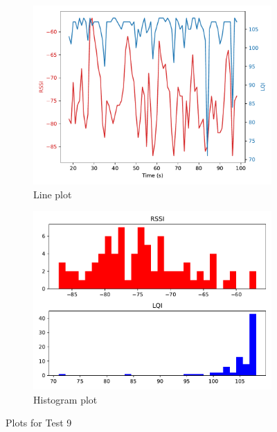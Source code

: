 \documentclass[runningheads]{llncs}
\begin{document}
\begin{figure}[ht]
    \centering
    \begin{subfigure}[b]{0.45\textwidth}
        \centering
        \includegraphics[width=\textwidth]{images/1-100-0-26-line.pdf}
        \caption{Line plot}
    \end{subfigure}
    \hfill
    \begin{subfigure}[b]{0.45\textwidth}
        \centering
        \includegraphics[width=\textwidth]{images/1-100-0-26-histogram.pdf}
        \caption{Histogram plot}
    \end{subfigure}
    \caption{Plots for Test 9}
\end{figure}
\end{document}
